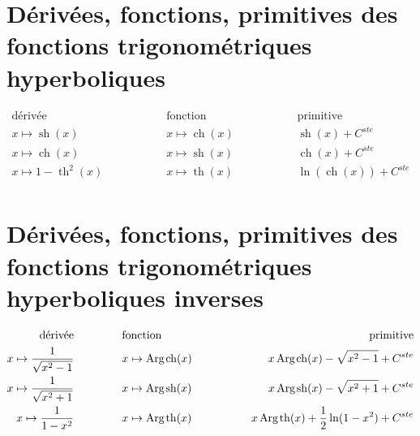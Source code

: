 \documentclass[a4paper,12pt]{report}
\renewcommand{\sinh}{\mathop{\mathrm{sh}}}
\renewcommand{\cosh}{\mathop{\mathrm{ch}}}
\renewcommand{\tanh}{\mathop{\mathrm{th}}}
\renewcommand{\arg}{\mathop{\mathrm{Arg}}}
\begin{document}
\section{Dérivées, fonctions, primitives des fonctions trigonométriques hyperboliques}

\begin{align*}
\textrm{dérivée} \hspace{2cm} & \textrm{fonction} \hspace{2cm} & \textrm{primitive}  \\ 
x \mapsto \sinh(x) \hspace{2cm} & x \mapsto \cosh(x) \hspace{2cm} & \sinh(x) + C^{ste}  \\
x \mapsto \cosh(x) \hspace{2cm} & x \mapsto \sinh(x) \hspace{2cm} & \cosh(x) + C^{ste}   \\
x \mapsto 1 - \tanh\nolimits^2(x) \hspace{2cm} & x \mapsto \tanh(x) \hspace{2cm} & \ln( \cosh(x)) + C^{ste} \\
\end{align*}




\section{Dérivées, fonctions, primitives des fonctions trigonométriques hyperboliques inverses}

\begin{align*}
\textrm{dérivée} \hspace{1.5cm} & \textrm{fonction} \hspace{1.5cm} & \textrm{primitive}  \\ 
x \mapsto \frac{1}{ \sqrt{x^2-1}} \hspace{1.5cm} & x \mapsto \arg\mspace{-1mu}\cosh(x) \hspace{1.5cm} & x \arg\mspace{-1mu}\cosh(x) - \sqrt{x^2-1} + C^{ste}  \\
x \mapsto \frac{1}{ \sqrt{x^2+1}} \hspace{1.5cm} & x \mapsto \arg\mspace{-1mu}\sinh(x) \hspace{1.5cm} & x \arg\mspace{-1mu}\sinh(x) - \sqrt{x^2 +1 } + C^{ste}   \\
x \mapsto \frac{1}{ 1 - x^2} \hspace{1.5cm} & x \mapsto \arg\mspace{-1mu}\tanh(x) \hspace{1.5cm} &  x \arg\mspace{-1mu}\tanh(x) + \frac{1}{2} \ln(1- x^2) + C^{ste} \\
\end{align*}
\end{document}
